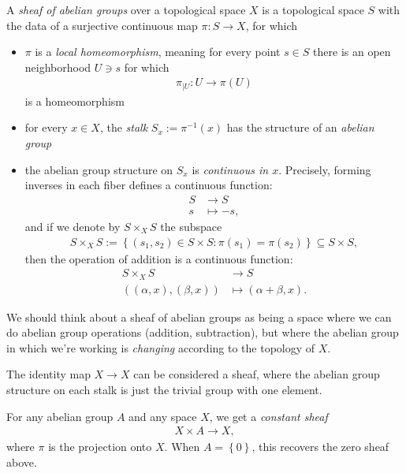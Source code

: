 \documentclass[11pt]{amsart}
\begin{document}
\begin{definition}\label{def:sheaf} 
A \emph{sheaf of abelian groups} over a topological space $X$ is a topological space $S$ with the data of a surjective continuous map $\pi \colon S \to X$, for which
\begin{itemize}
    \item $\pi$ is a \emph{local homeomorphism}, meaning for every point $s\in S$ there is an open neighborhood $U\ni s$ for which
    \begin{align*}
        \pi_{|U} \colon U \to \pi(U)
    \end{align*}
    is a homeomorphism
    \item for every $x\in X$, the \emph{stalk} $S_x := \pi^{-1}(x)$ has the structure of an \emph{abelian group}
    \item the abelian group structure on $S_x$ is \emph{continuous in $x$}. Precisely, forming inverses in each fiber defines a continuous function:
    \begin{align*}
        S &\to S \\
        s &\mapsto -s,
    \end{align*}    
and if we denote by $S \times_X S$ the subspace
    \begin{align*}
        S \times_X S := \left\{ (s_1,s_2) \in S \times S \colon \pi(s_1)=\pi(s_2) \right\} \subseteq S \times S,
    \end{align*}
    then the operation of addition is a continuous function:
    \begin{align*}
        S \times_X S &\to S \\
        \left( (\alpha,x), (\beta,x) \right) &\mapsto (\alpha + \beta,x).
    \end{align*}
\end{itemize}
\end{definition}

We should think about a sheaf of abelian groups as being a space where we can do abelian group operations (addition, subtraction), but where the abelian group in which we're working is \emph{changing} according to the topology of $X$.

\begin{example} The identity map $X \to X$ can be considered a sheaf, where the abelian group structure on each stalk is just the trivial group with one element.
\end{example}


\begin{example}
\label{exa:constant-sheaf-espace-etale}
For any abelian group $A$ and any space $X$, we get a \emph{constant sheaf}
\begin{align*}
    X \times A \to X,
\end{align*}
where $\pi$ is the projection onto $X$. When $A = \left\{ 0 \right\}$, this recovers the zero sheaf above.
\end{example}
\end{document}
